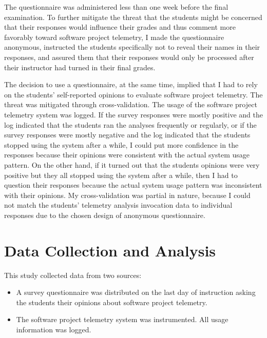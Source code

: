 The questionnaire was administered less than one week before the final examination. To further mitigate the threat that the students might be concerned that their responses would influence their grades and thus comment more favorably toward software project telemetry, I made the questionnaire anonymous, instructed the students specifically not to reveal their names in their responses, and assured them that their responses would only be processed after their instructor had turned in their final grades.
	
The decision to use a questionnaire, at the same time, implied that I had to rely on the students' self-reported opinions to evaluate software project telemetry. The threat was mitigated through cross-validation. The usage of the software project telemetry system was logged. If the survey responses were mostly positive and the log indicated that the students ran the analyses frequently or regularly, or if the survey responses were mostly negative and the log indicated that the students stopped using the system after a while, I could put more confidence in the responses because their opinions were consistent with the actual system usage pattern. On the other hand, if it turned out that the students opinions were very positive but they all stopped using the system after a while, then I had to question their responses because the actual system usage pattern was inconsistent with their opinions. My cross-validation was partial in nature, because I could not match the students' telemetry analysis invocation data to individual responses due to the chosen design of anonymous questionnaire.







\section{Data Collection and Analysis} \label{EvaluationInClassroom:DataCollection}

This study collected data from two sources:
\begin{itemize}
	\item A survey questionnaire was distributed on the last day of instruction asking the students their opinions about software project telemetry.
	\item The software project telemetry system was instrumented. All usage information was logged.
\end{itemize}

